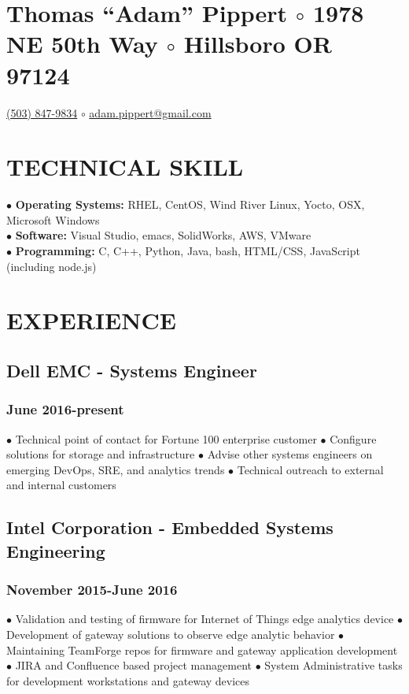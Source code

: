 \documentclass{article}
\begin{document}
\section*{Thomas ``Adam'' Pippert $\circ$
1978 NE 50th Way $\circ$
Hillsboro OR 97124}
\href{tel:+15038479834}{(503) 847-9834} $\circ$
\href{mailto:adam.pippert@gmail.com}{adam.pippert@gmail.com}

\section*{TECHNICAL SKILL}


$\bullet$ \textbf{Operating Systems:} RHEL, CentOS, Wind River Linux, Yocto, OSX, Microsoft Windows\\
$\bullet$ \textbf{Software:} Visual Studio, emacs, SolidWorks, AWS, VMware\\
$\bullet$ \textbf{Programming:} C, C++, Python, Java, bash, HTML/CSS, JavaScript (including node.js)\\


\section*{EXPERIENCE}

\subsection*{Dell EMC - Systems Engineer}
\subsubsection*{June 2016-present}

$\bullet$ Technical point of contact for Fortune 100 enterprise customer
$\bullet$ Configure solutions for storage and infrastructure
$\bullet$ Advise other systems engineers on emerging DevOps, SRE, and analytics trends
$\bullet$ Technical outreach to external and internal customers

\subsection*{Intel Corporation - Embedded Systems Engineering}
\subsubsection*{November 2015-June 2016}

$\bullet$ Validation and testing of firmware for Internet of Things edge analytics device
$\bullet$ Development of gateway solutions to observe edge analytic behavior
$\bullet$ Maintaining TeamForge repos for firmware and gateway application development
$\bullet$ JIRA and Confluence based project management
$\bullet$ System Administrative tasks for development workstations and gateway devices
\end{document}
